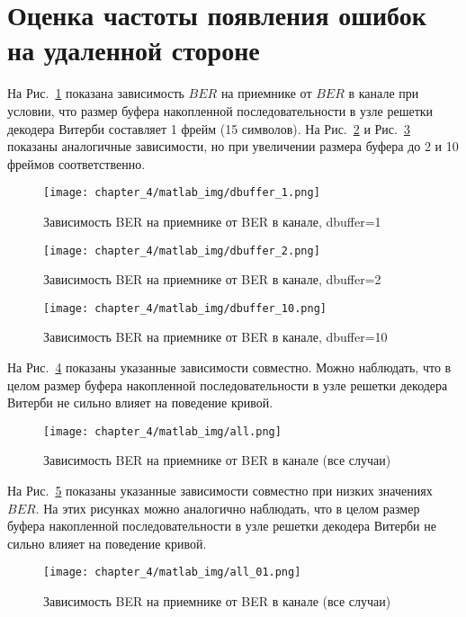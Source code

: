\section{Оценка частоты появления ошибок на удаленной стороне}
На Рис.~\ref{img_06} показана зависимость $BER$ на приемнике от $BER$ в канале при условии, что размер буфера накопленной
последовательности в узле решетки декодера Витерби составляет 1 фрейм (15 символов). На Рис.~\ref{img_07} и 
Рис.~\ref{img_08} показаны аналогичные зависимости, но при увеличении размера буфера до 2 и 10 фреймов соответственно.

\begin{figure}[h]
\begin{center}
\texttt{[image: chapter\_4/matlab\_img/dbuffer\_1.png]}
\caption{Зависимость BER на приемнике от BER в канале, dbuffer=1}
\label{img_06}
\end{center}
\end{figure}

\begin{figure}[h]
\begin{center}
\texttt{[image: chapter\_4/matlab\_img/dbuffer\_2.png]}
\caption{Зависимость BER на приемнике от BER в канале, dbuffer=2}
\label{img_07}
\end{center}
\end{figure}

\begin{figure}[h]
\begin{center}
\texttt{[image: chapter\_4/matlab\_img/dbuffer\_10.png]}
\caption{Зависимость BER на приемнике от BER в канале, dbuffer=10}
\label{img_08}
\end{center}
\end{figure}

На Рис.~\ref{img_09} показаны указанные зависимости совместно. Можно наблюдать, что в целом размер буфера накопленной
последовательности в узле решетки декодера Витерби не сильно влияет на поведение кривой.
\begin{figure}[h]
\begin{center}
\texttt{[image: chapter\_4/matlab\_img/all.png]}
\caption{Зависимость BER на приемнике от BER в канале (все случаи)}
\label{img_09}
\end{center}
\end{figure}

На Рис.~\ref{img_10} показаны указанные зависимости совместно при низких значениях $BER$. На этих рисунках можно аналогично
наблюдать, что в целом размер буфера накопленной последовательности в узле решетки декодера Витерби не сильно влияет на поведение кривой.
\begin{figure}[h]
\begin{center}
\texttt{[image: chapter\_4/matlab\_img/all\_01.png]}
\caption{Зависимость BER на приемнике от BER в канале (все случаи)}
\label{img_10}
\end{center}
\end{figure}

